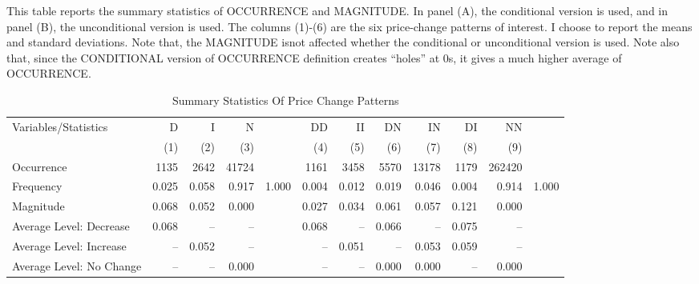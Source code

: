 \clearpage
\begin{table}
	\caption{Summary Statistics Of Price Change Patterns}\label{tbl:summary}
	{
		\footnotesize This table reports the summary statistics of OCCURRENCE and MAGNITUDE. In panel (A), the conditional version is used, and in panel (B), the unconditional version is used. The columns (1)-(6) are the six price-change patterns of interest. I choose to report the means and standard deviations. Note that, the MAGNITUDE isnot affected whether the conditional or unconditional version is used. Note also that, since the CONDITIONAL version of OCCURRENCE definition creates ``holes'' at 0s, it gives a much higher average of OCCURRENCE.
		\begin{tabular}{lrrrrrrrrrrr}
			\hline\hline
			Variables/Statistics     &     D &     I &     N &       &    DD &    II &    DN &    IN &    DI &     NN &       \\
			                         &   (1) &   (2) &   (3) &       &   (4) &   (5) &   (6) &   (7) &   (8) &    (9) &       \\ \hline\hline
			Occurrence               &  1135 &  2642 & 41724 &       &  1161 &  3458 &  5570 & 13178 &  1179 & 262420 &       \\
			Frequency                & 0.025 & 0.058 & 0.917 & 1.000 & 0.004 & 0.012 & 0.019 & 0.046 & 0.004 &  0.914 & 1.000 \\
			Magnitude                & 0.068 & 0.052 & 0.000 &       & 0.027 & 0.034 & 0.061 & 0.057 & 0.121 &  0.000 &       \\ \hline
			Average Level: Decrease  & 0.068 &    -- &    -- &       & 0.068 &    -- & 0.066 &    -- & 0.075 &     -- &       \\
			Average Level: Increase  &    -- & 0.052 &    -- &       &    -- & 0.051 &    -- & 0.053 & 0.059 &     -- &       \\
			Average Level: No Change &    -- &    -- & 0.000 &       &    -- &    -- & 0.000 & 0.000 &    -- &  0.000 &       \\ \hline\hline
		\end{tabular}
	}
\end{table}

